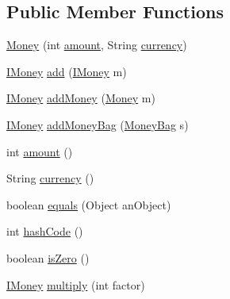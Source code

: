 \subsection*{Public Member Functions}
\begin{DoxyCompactItemize}
\item 
\hyperlink{classes_1_1deusto_1_1testing_1_1junit_1_1_money_a6f1749eb364c59ed038f79cf8965e3bc}{Money} (int \hyperlink{classes_1_1deusto_1_1testing_1_1junit_1_1_money_a9bef5d9027f270e8ce0303e4f929bbd5}{amount}, String \hyperlink{classes_1_1deusto_1_1testing_1_1junit_1_1_money_aefa4aaf62bb653eae25851d98ae02dcb}{currency})
\item 
\hyperlink{interfacees_1_1deusto_1_1testing_1_1junit_1_1_i_money}{I\+Money} \hyperlink{classes_1_1deusto_1_1testing_1_1junit_1_1_money_a6a3d64861c49dee89ffd0ed0c576045d}{add} (\hyperlink{interfacees_1_1deusto_1_1testing_1_1junit_1_1_i_money}{I\+Money} m)
\item 
\hyperlink{interfacees_1_1deusto_1_1testing_1_1junit_1_1_i_money}{I\+Money} \hyperlink{classes_1_1deusto_1_1testing_1_1junit_1_1_money_a223a447d5daf23b5e9cc0f551b72e328}{add\+Money} (\hyperlink{classes_1_1deusto_1_1testing_1_1junit_1_1_money}{Money} m)
\item 
\hyperlink{interfacees_1_1deusto_1_1testing_1_1junit_1_1_i_money}{I\+Money} \hyperlink{classes_1_1deusto_1_1testing_1_1junit_1_1_money_ad9a107a6884026a1bb12102d3a8a5b41}{add\+Money\+Bag} (\hyperlink{classes_1_1deusto_1_1testing_1_1junit_1_1_money_bag}{Money\+Bag} s)
\item 
int \hyperlink{classes_1_1deusto_1_1testing_1_1junit_1_1_money_a9bef5d9027f270e8ce0303e4f929bbd5}{amount} ()
\item 
String \hyperlink{classes_1_1deusto_1_1testing_1_1junit_1_1_money_aefa4aaf62bb653eae25851d98ae02dcb}{currency} ()
\item 
boolean \hyperlink{classes_1_1deusto_1_1testing_1_1junit_1_1_money_a2356df38b8e9ecdd969bab11d6dd301b}{equals} (Object an\+Object)
\item 
int \hyperlink{classes_1_1deusto_1_1testing_1_1junit_1_1_money_af6cfb5b27bf97170d990dea12de04f37}{hash\+Code} ()
\item 
boolean \hyperlink{classes_1_1deusto_1_1testing_1_1junit_1_1_money_a797658a03260b535e9a36ebbcc3b19c9}{is\+Zero} ()
\item 
\hyperlink{interfacees_1_1deusto_1_1testing_1_1junit_1_1_i_money}{I\+Money} \hyperlink{classes_1_1deusto_1_1testing_1_1junit_1_1_money_a02c7d4e9013710f70d1d46e9c9ebae88}{multiply} (int factor)

\end{DoxyCompactItemize}
